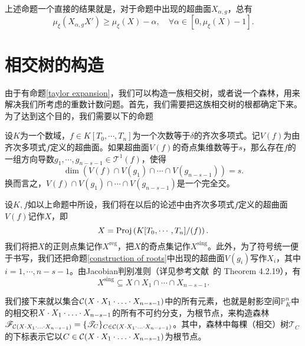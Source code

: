 \begin{remark}
上述命题一个直接的结果就是，对于命题中出现的超曲面$X_{\alpha,g}$，总有
\begin{equation}
\mu_{\xi}(X_{\alpha,g}X') \geqslant \mu_{\xi}(X) - \alpha, \quad \forall \alpha \in [0,\mu_\xi(X)-1].
\end{equation}
\end{remark}

\section{相交树的构造}
\label{construction of intersection trees}
由于有命题\ref{taylor expansion}，我们可以构造一族相交树，或者说一个森林，用来解决我们所考虑的重数计数问题。首先，我们需要把这族相交树的根都确定下来。为了达到这个目的，我们需要以下的命题

\begin{proposition} \label{construction of roots}
设$K$为一个数域，$f\in K[T_0,\cdots,T_n]$为一个次数等于$\delta$的齐次多项式。记$V(f)$为由齐次多项式$f$定义的超曲面。如果超曲面$V(f)$的奇点集维数等于$s$，那么存在$f$的一组方向导数$g_1,\cdots, g_{n-s-1}\in\mathcal{T}^1(f)$，使得
\begin{equation}
\dim(V(f)\cap V(g_1)\cap\cdots\cap V(g_{n-s-1}))=s.
\end{equation}
换而言之，$V(f)\cap V(g_1)\cap\cdots\cap V(g_{n-s-1})$是一个完全交。
\end{proposition}

设$K,f$如以上命题中所设，我们将在以后的论述中由齐次多项式$f$定义的超曲面$V(f)$记作$X$，即
\begin{equation}
X = \operatorname{Proj}\left(K[T_0,\cdots,T_n]/(f)\right).
\end{equation}
我们将把$X$的正则点集记作$X^{\mathrm{reg}}$，把$X$的奇点集记作$X^{\mathrm{sing}}$。此外，为了符号统一便于书写，我们还把命题\ref{construction of roots}中出现的超曲面$V(g_i)$写作$X_i$，其中$i=1,\cdots,n-s-1$。由Jacobian判别准则（详见参考文献~的 Theorem 4.2.19），有
\begin{equation}
X^{\mathrm{sing}} \subseteq X\cap X_1\cap\cdots\cap X_{n-s-1}.
\end{equation}

我们接下来就以集合$\mathcal C(X\cdot X_{1}\cdot\ldots\cdot X_{n-s-1})$中的所有元素，也就是射影空间$\mathbb{P}_K^n$中的相交积$X\cdot X_{1}\cdot\ldots\cdot X_{n-s-1}$的所有不可约分支，为根节点，来构造森林$\mathscr{F}_{\mathcal C(X\cdot X_{1}\cdot\ldots\cdot X_{n-s-1})} = \{\mathscr T_C\}_{C\in\mathcal C(X\cdot X_{1}\cdot\ldots\cdot X_{n-s-1})}$。其中，森林中每棵（相交）树$\mathscr T_C$的下标表示它以$C\in\mathcal C(X\cdot X_{1}\cdot\ldots\cdot X_{n-s-1})$为根节点。

